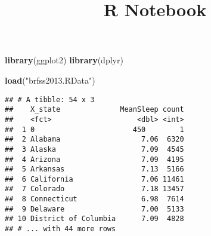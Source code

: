 \documentclass[]{article}
\title{R Notebook}
\author{}
\date{}
\newenvironment{Shaded}{\begin{snugshade}}{\end{snugshade}}
\newcommand{\KeywordTok}[1]{\textcolor[rgb]{0.13,0.29,0.53}{\textbf{#1}}}
\newcommand{\DataTypeTok}[1]{\textcolor[rgb]{0.13,0.29,0.53}{#1}}
\newcommand{\StringTok}[1]{\textcolor[rgb]{0.31,0.60,0.02}{#1}}
\newcommand{\OperatorTok}[1]{\textcolor[rgb]{0.81,0.36,0.00}{\textbf{#1}}}
\newcommand{\NormalTok}[1]{#1}
\begin{document}
\maketitle

\begin{Shaded}
\begin{Highlighting}[]
\KeywordTok{library}\NormalTok{(ggplot2)}
\KeywordTok{library}\NormalTok{(dplyr)}
\end{Highlighting}
\end{Shaded}

\begin{Shaded}
\begin{Highlighting}[]
\KeywordTok{load}\NormalTok{(}\StringTok{"brfss2013.RData"}\NormalTok{)}
\end{Highlighting}
\end{Shaded}

\begin{Shaded}
\end{Shaded}

\begin{verbatim}
## # A tibble: 54 x 3
##    X_state              MeanSleep count
##    <fct>                    <dbl> <int>
##  1 0                       450        1
##  2 Alabama                   7.06  6320
##  3 Alaska                    7.09  4545
##  4 Arizona                   7.09  4195
##  5 Arkansas                  7.13  5166
##  6 California                7.06 11461
##  7 Colorado                  7.18 13457
##  8 Connecticut               6.98  7614
##  9 Delaware                  7.00  5133
## 10 District of Columbia      7.09  4828
## # ... with 44 more rows
\end{verbatim}

\begin{Shaded}
\end{Shaded}
\end{document}

